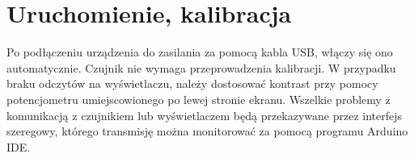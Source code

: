 \chapter{Uruchomienie, kalibracja}

Po podłączeniu urządzenia do zasilania za pomocą kabla USB, włączy się ono automatycznie. Czujnik nie wymaga przeprowadzenia kalibracji. W przypadku braku odczytów na wyświetlaczu, należy dostosować kontrast przy pomocy potencjometru umiejscowionego po lewej stronie ekranu. Wszelkie problemy z komunikacją z czujnikiem lub wyświetlaczem będą przekazywane przez interfejs szeregowy, którego transmisję można monitorować za pomocą programu Arduino IDE.

